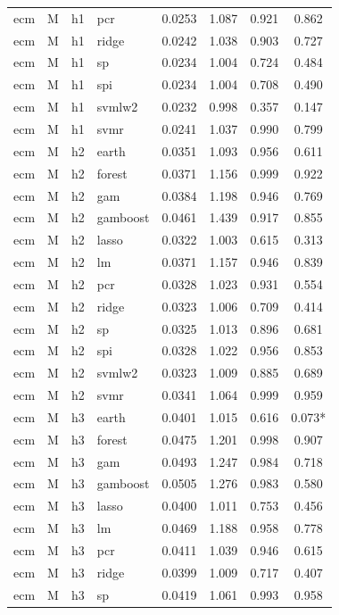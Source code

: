 \begin{ThreePartTable}
\begin{longtable}[t]{llclcccc}
ecm & M & h1 & pcr & 0.0253 & 1.087 & 0.921 & 0.862\\
ecm & M & h1 & ridge & 0.0242 & 1.038 & 0.903 & 0.727\\
ecm & M & h1 & sp & 0.0234 & 1.004 & 0.724 & 0.484\\
ecm & M & h1 & spi & 0.0234 & 1.004 & 0.708 & 0.490\\
ecm & M & h1 & svmlw2 & 0.0232 & 0.998 & 0.357 & 0.147\\
ecm & M & h1 & svmr & 0.0241 & 1.037 & 0.990 & 0.799\\
\addlinespace
ecm & M & h2 & earth & 0.0351 & 1.093 & 0.956 & 0.611\\
ecm & M & h2 & forest & 0.0371 & 1.156 & 0.999 & 0.922\\
ecm & M & h2 & gam & 0.0384 & 1.198 & 0.946 & 0.769\\
ecm & M & h2 & gamboost & 0.0461 & 1.439 & 0.917 & 0.855\\
ecm & M & h2 & lasso & 0.0322 & 1.003 & 0.615 & 0.313\\
ecm & M & h2 & lm & 0.0371 & 1.157 & 0.946 & 0.839\\
ecm & M & h2 & pcr & 0.0328 & 1.023 & 0.931 & 0.554\\
ecm & M & h2 & ridge & 0.0323 & 1.006 & 0.709 & 0.414\\
ecm & M & h2 & sp & 0.0325 & 1.013 & 0.896 & 0.681\\
ecm & M & h2 & spi & 0.0328 & 1.022 & 0.956 & 0.853\\
ecm & M & h2 & svmlw2 & 0.0323 & 1.009 & 0.885 & 0.689\\
ecm & M & h2 & svmr & 0.0341 & 1.064 & 0.999 & 0.959\\
\addlinespace
ecm & M & h3 & earth & 0.0401 & 1.015 & 0.616 & 0.073*\\
ecm & M & h3 & forest & 0.0475 & 1.201 & 0.998 & 0.907\\
ecm & M & h3 & gam & 0.0493 & 1.247 & 0.984 & 0.718\\
ecm & M & h3 & gamboost & 0.0505 & 1.276 & 0.983 & 0.580\\
ecm & M & h3 & lasso & 0.0400 & 1.011 & 0.753 & 0.456\\
ecm & M & h3 & lm & 0.0469 & 1.188 & 0.958 & 0.778\\
ecm & M & h3 & pcr & 0.0411 & 1.039 & 0.946 & 0.615\\
ecm & M & h3 & ridge & 0.0399 & 1.009 & 0.717 & 0.407\\
ecm & M & h3 & sp & 0.0419 & 1.061 & 0.993 & 0.958\\

\end{longtable}
\end{ThreePartTable}

